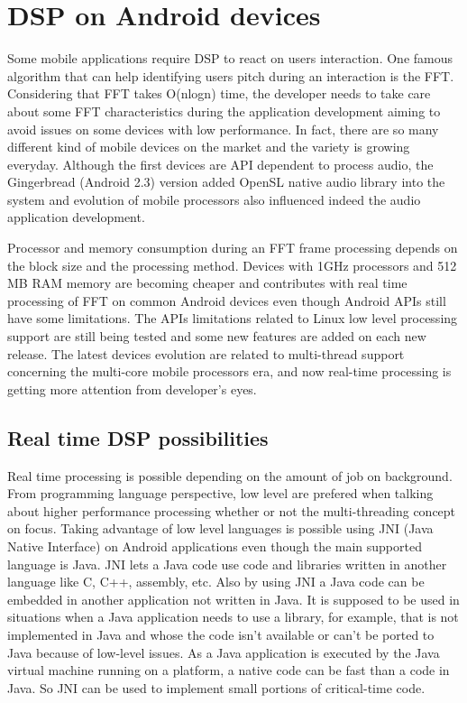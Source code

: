 \documentclass[12pt]{article}
\begin{document}
\section{DSP on Android devices}

Some  mobile applications require DSP to react on users interaction. One
famous algorithm that can help identifying users pitch during an  interaction
is the FFT. Considering that FFT takes O(nlogn) time, the  developer needs to
take care about some FFT characteristics during the  application development
aiming to avoid issues on some devices with low  performance. In fact, there
are so many different kind of mobile devices  on the market and the variety is
growing everyday. Although the first  devices are API dependent to process
audio, the Gingerbread (Android  2.3) version added OpenSL native audio
library into the system \citep{Pathak2011,LazzaLAC} and evolution of mobile
processors also  influenced indeed the audio application development. 


Processor  and memory consumption during an FFT frame processing depends on
the  block size and the processing method. Devices with 1GHz processors and
512 MB RAM memory are becoming cheaper and contributes with real time
processing of FFT on common Android devices even though Android APIs  still
have some limitations. The APIs limitations related to Linux low level
processing support are still being tested and some new features  are added on
each new release. The latest devices evolution are related  to multi-thread
support concerning the multi-core mobile processors era,  and now real-time
processing is getting more attention from developer's  eyes.


\subsection{Real time DSP possibilities}

Real  time processing is possible depending on the amount of job on
background. From programming language perspective, low level are  prefered
when talking about higher performance processing whether or not  the
multi-threading concept on focus. Taking advantage of low level  languages is
possible using JNI (Java Native Interface) on Android  applications even
though the main supported language is Java. JNI lets a  Java code use code and
libraries written in another language like C,  C++, assembly, etc. Also by
using JNI a Java code can be embedded in  another application not written in
Java. It is supposed to be used in  situations when a Java application needs
to use a library, for example,  that is not implemented in Java and whose the
code isn't available or  can't be ported to Java because of low-level issues.
As a Java  application is executed by the Java virtual machine running on a
platform, a native code can be fast than a code in Java. So JNI can be  used
to implement small portions of critical-time code.
\end{document}
